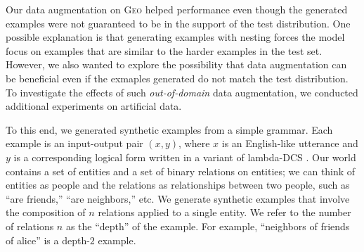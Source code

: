 \documentclass[11pt,letterpaper]{article}
\newcommand{\geo}{\textsc{Geo}\xspace}
\begin{document}
Our data augmentation on \geo helped performance
even though the generated examples were not guaranteed
to be in the support of the test distribution.
One possible explanation is that generating examples with nesting
forces the model focus on examples that are similar to the harder examples
in the test set.
However, we also wanted to explore the possibility that
data augmentation can be beneficial even if the exmaples generated
do not match the test distribution.
To investigate the effects of such \emph{out-of-domain} data augmentation,
we conducted additional experiments on artificial data.

To this end, we generated synthetic examples from a simple grammar.
Each example is an input-output pair $(x, y)$, where
$x$ is an English-like utterance and $y$ is a corresponding
logical form written in a variant of lambda-DCS \cite{liang2013lambdadcs}.
Our world contains a set of entities and a set of binary relations
on entities; we can think of entities as people
and the relations as relationships between two people, such as ``are friends,''
``are neighbors,'' etc.
We generate synthetic examples that involve the 
composition of $n$ relations applied to a single entity.  
We refer to the number of relations $n$ as the ``depth'' of the example.
For example, ``neighbors of friends of alice''
is a depth-$2$ example.
\end{document}

